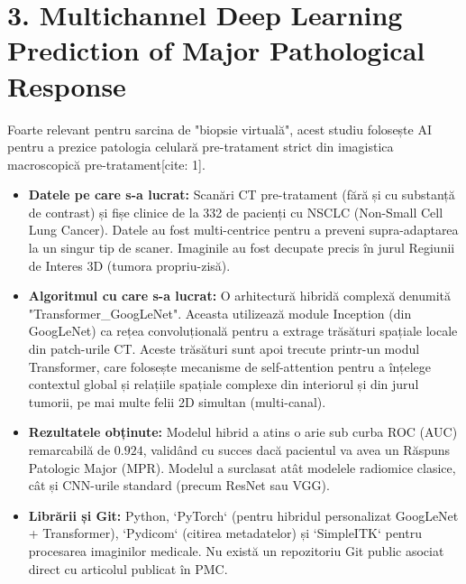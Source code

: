 \documentclass[runningheads,a4paper,11pt]{report}
\begin{document}
\section{3. Multichannel Deep Learning Prediction of Major Pathological Response}
Foarte relevant pentru sarcina de "biopsie virtuală", acest studiu folosește AI pentru a prezice patologia celulară pre-tratament strict din imagistica macroscopică pre-tratament[cite: 1].
\begin{itemize}
    \item \textbf{Datele pe care s-a lucrat:} Scanări CT pre-tratament (fără și cu substanță de contrast) și fișe clinice de la 332 de pacienți cu NSCLC (Non-Small Cell Lung Cancer). Datele au fost multi-centrice pentru a preveni supra-adaptarea la un singur tip de scaner. Imaginile au fost decupate precis în jurul Regiunii de Interes 3D (tumora propriu-zisă).
    \item \textbf{Algoritmul cu care s-a lucrat:} O arhitectură hibridă complexă denumită "Transformer\_GoogLeNet". Aceasta utilizează module Inception (din GoogLeNet) ca rețea convoluțională pentru a extrage trăsături spațiale locale din patch-urile CT. Aceste trăsături sunt apoi trecute printr-un modul Transformer, care folosește mecanisme de self-attention pentru a înțelege contextul global și relațiile spațiale complexe din interiorul și din jurul tumorii, pe mai multe felii 2D simultan (multi-canal).
    \item \textbf{Rezultatele obținute:} Modelul hibrid a atins o arie sub curba ROC (AUC) remarcabilă de $0.924$, validând cu succes dacă pacientul va avea un Răspuns Patologic Major (MPR). Modelul a surclasat atât modelele radiomice clasice, cât și CNN-urile standard (precum ResNet sau VGG).
    \item \textbf{Librării și Git:} Python, `PyTorch` (pentru hibridul personalizat GoogLeNet + Transformer), `Pydicom` (citirea metadatelor) și `SimpleITK` pentru procesarea imaginilor medicale. Nu există un repozitoriu Git public asociat direct cu articolul publicat în PMC.
\end{itemize}
\end{document}
